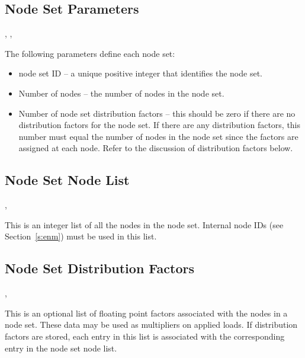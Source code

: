 \subsection{Node Set Parameters}

\begin{spacing}{1.5}
\api {}, , 
\end{spacing}

{The following parameters define each node set:}

\begin{itemize}
 \item {node set ID -- a unique positive integer that identifies the
 node set.}

 \item {Number of nodes -- the number of nodes in the node 
set.}

 \item {Number of node set distribution factors -- this should be zero
 if there are no distribution factors for the node set. If there are
 any distribution factors, this number must equal the number of nodes
 in the node set since the factors are assigned at each node. Refer to
 the discussion of distribution factors below.}
\end{itemize}



\subsection{Node Set Node List}

\begin{spacing}{1.5}
\api {}, 
\end{spacing}

{This is an integer list of all the nodes in the node set. Internal
node IDs (see Section~\ref{s:enm}) must be used in this list.}



\subsection{Node Set Distribution Factors}

\begin{spacing}{1.5}
\api {}, 
\end{spacing}

{This is an optional list of floating point factors associated with
the nodes in a node set. These data may be used as multipliers on
applied loads. If distribution factors are stored, each entry in this
list is associated with the corresponding entry in the node set node
list.}


